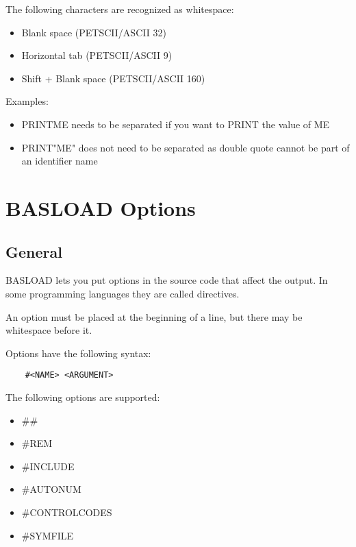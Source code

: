 \documentclass{article}
\begin{document}
        The following characters are recognized as whitespace:

        \begin{itemize}
            \item Blank space (PETSCII/ASCII 32)
            \item Horizontal tab (PETSCII/ASCII 9)
            \item Shift + Blank space (PETSCII/ASCII 160)
        \end{itemize}

        Examples:

        \begin{itemize}
            \item PRINTME needs to be separated if you want to PRINT the value of ME
            \item PRINT"ME" does not need to be separated as double quote cannot be part of an identifier name
        \end{itemize}

\section{BASLOAD Options}

    \subsection{General}

        BASLOAD lets you put options in the source code that affect the output. In some
        programming languages they are called directives.

        An option must be placed at the beginning of a line, but there may be
        whitespace before it.

        Options have the following syntax:

        \begin{verbatim}
    #<NAME> <ARGUMENT>
        \end{verbatim}

        The following options are supported:

        \begin{itemize}
            \item \#\#
            \item \#REM
            \item \#INCLUDE
            \item \#AUTONUM
            \item \#CONTROLCODES
            \item \#SYMFILE
        \end{itemize}
\end{document}

